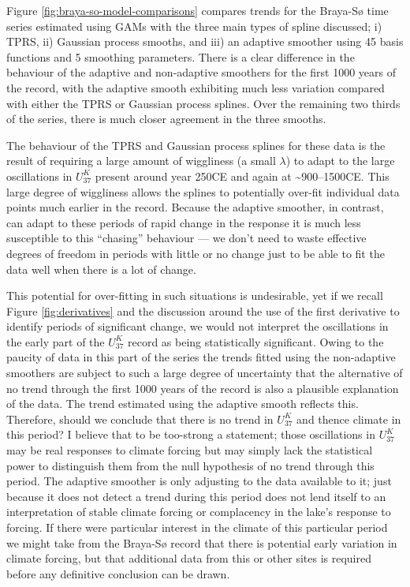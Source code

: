 \documentclass[12pt,]{article}
\newcommand{\uk}{\ensuremath{\mathit{U}^{\mathit{K}}_{\mathup{37}}}}
\begin{document}
Figure \ref{fig:braya-so-model-comparisons} compares trends for the
Braya-Sø time series estimated using GAMs with the three main types of
spline discussed; i) TPRS, ii) Gaussian process smooths, and iii) an
adaptive smoother using 45 basis functions and 5 smoothing parameters.
There is a clear difference in the behaviour of the adaptive and
non-adaptive smoothers for the first 1000 years of the record, with the
adaptive smooth exhibiting much less variation compared with either the
TPRS or Gaussian process splines. Over the remaining two thirds of the
series, there is much closer agreement in the three smooths.

The behaviour of the TPRS and Gaussian process splines for these data is
the result of requiring a large amount of wiggliness (a small
\(\lambda\)) to adapt to the large oscillations in \uk{} present around
year 250CE and again at \textasciitilde{}900--1500CE. This large degree
of wiggliness allows the splines to potentially over-fit individual data
points much earlier in the record. Because the adaptive smoother, in
contrast, can adapt to these periods of rapid change in the response it
is much less susceptible to this ``chasing'' behaviour --- we don't need
to waste effective degrees of freedom in periods with little or no
change just to be able to fit the data well when there is a lot of
change.

This potential for over-fitting in such situations is undesirable, yet
if we recall Figure \ref{fig:derivatives} and the discussion around the
use of the first derivative to identify periods of significant change,
we would not interpret the oscillations in the early part of the \uk{}
record as being statistically significant. Owing to the paucity of data
in this part of the series the trends fitted using the non-adaptive
smoothers are subject to such a large degree of uncertainty that the
alternative of no trend through the first 1000 years of the record is
also a plausible explanation of the data. The trend estimated using the
adaptive smooth reflects this. Therefore, should we conclude that there
is no trend in \uk{} and thence climate in this period? I believe that
to be too-strong a statement; those oscillations in \uk{} may be real
responses to climate forcing but may simply lack the statistical power
to distinguish them from the null hypothesis of no trend through this
period. The adaptive smoother is only adjusting to the data available to
it; just because it does not detect a trend during this period does not
lend itself to an interpretation of stable climate forcing or
complacency in the lake's response to forcing. If there were particular
interest in the climate of this particular period we might take from the
Braya-Sø record that there is potential early variation in climate
forcing, but that additional data from this or other sites is required
before any definitive conclusion can be drawn.
\end{document}
